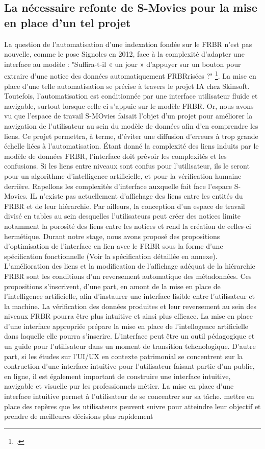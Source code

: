 \subsection{La nécessaire refonte de S-Movies pour la mise en place d'un tel projet}
La question de l'automatisation d'une indexation fondée sur le FRBR n'est pas nouvelle, comme le pose Signoles en 2012, face à la complexité d'adapter une interface au modèle : "Suffira-t-il « un jour » d’appuyer sur un bouton pour extraire d’une notice des données automatiquement FRBRrisées ?" \footcite{signoles}. La mise en place d'une telle automatisation se précise à travers le projet IA chez Skinsoft. Toutefois, l'automatisation est conditionnée par une interface utilisateur fluide et navigable, surtout lorsque celle-ci s'appuie sur le modèle FRBR. Or, nous avons vu que l'espace de travail S-MOvies faisait l'objet d'un projet pour améliorer la navigation de l'utilisateur au sein du modèle de données afin d'en comprendre les liens. Ce projet permettra, à terme, d'éviter une diffusion d'erreurs à trop grande échelle liées à l'automatisation. Étant donné la complexité des liens induits par le modèle de données FRBR, l'interface doit prévoir les complexités et les confusions. Si les liens entre niveaux sont confus pour l'utilisateur, ils le seront pour un algorithme d'intelligence artificielle, et pour la vérification humaine derrière. 
Rapellons les complexités d'interface auxquelle fait face l'espace S-Movies. IL n'existe pas actuellement d'affichage des liens entre les entités du FRBR et de leur hiérarchie. Par ailleurs, la conception d'un espace de travail divisé en tables au sein desquelles l'utilisateurs peut créer des notices limite notamment la porosité des liens entre les notices et rend la création de celles-ci hermétique. 
Durant notre stage, nous avons proposé des propositions d'optimisation de l'interface en lien avec le FRBR sous la forme d'une spécification fonctionnelle (Voir la spécification détaillée en annexe). 
L'amélioration des liens et la modification de l'affichage adéquat de la hiérarchie FRBR sont les conditions d'un reversement automatique des métadonnées.
Ces propositions s'inscrivent, d'une part, en amont de la mise en place de l'intelligence artificielle, afin d'instaurer une interface lisible entre l'utilisateur et la machine. La vérification des données produites et leur reversement au sein des niveaux FRBR pourra être plus intuitive et ainsi plus efficace. La mise en place d'une interface appropriée prépare la mise en place de l'intellogence artificielle dans laquelle elle pourra s'inscrire. L'interface peut être un outil pédagogique et un guide pour l'utilisateur dans un moment de transition tehcnologique. D'autre part, si les études sur l'UI/UX en contexte patrimonial se concentrent sur la contruction d'une interface intuitive pour l'utilisateur faisant partie d'un public, en ligne, il est également important de construire une interface intuitive, navigable et visuelle pur les professionnels métier. La mise en place d'une interface intuitive permet à l'utilisateur de se concentrer sur sa tâche. mettre en place des repères que les utilisateurs peuvent suivre pour atteindre leur objectif et prendre de meilleures décisions plus rapidement 

